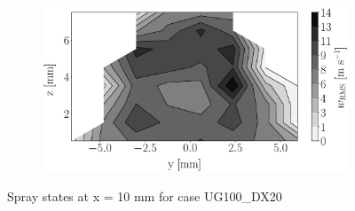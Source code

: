 \begin{figure}[h!]
\begin{subfigure}[b]{0.22\textwidth}
\end{subfigure}
   \hspace{0.17in}
\begin{subfigure}[b]{0.22\textwidth}
	\centering
   \includegraphics[scale=0.17]{./part2_developments/figures_ch5_resolved_JICF/injectors_SLI/uG100_dx20_x10_uz_rms_map.eps}
\end{subfigure}
\caption{Spray states at x = 10 mm for case UG100\_DX20}
\label{fig:injectors_sli_uG100_dx20_x10}
\end{figure}




